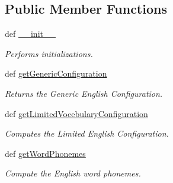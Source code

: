 \subsection*{Public Member Functions}
\begin{DoxyCompactItemize}
\item 
def \hyperlink{classrapp__speech__detection__sphinx4_1_1english__support_1_1EnglishSupport_a399297def83e8843368fb4a1d3ca526b}{\-\_\-\-\_\-init\-\_\-\-\_\-}
\begin{DoxyCompactList}\small\item\em Performs initializations. \end{DoxyCompactList}\item 
def \hyperlink{classrapp__speech__detection__sphinx4_1_1english__support_1_1EnglishSupport_afc762995b000472cb6746cc8e6a427c9}{get\-Generic\-Configuration}
\begin{DoxyCompactList}\small\item\em Returns the Generic English Configuration. \end{DoxyCompactList}\item 
def \hyperlink{classrapp__speech__detection__sphinx4_1_1english__support_1_1EnglishSupport_aee8fe0bceba35b725d6cf04ab7213016}{get\-Limited\-Vocebulary\-Configuration}
\begin{DoxyCompactList}\small\item\em Computes the Limited English Configuration. \end{DoxyCompactList}\item 
def \hyperlink{classrapp__speech__detection__sphinx4_1_1english__support_1_1EnglishSupport_a6b2a2e85a48b8c2887facecdb42ae251}{get\-Word\-Phonemes}
\begin{DoxyCompactList}\small\item\em Compute the English word phonemes. \end{DoxyCompactList}\end{DoxyCompactItemize}
